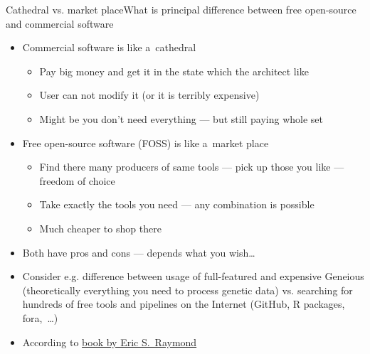 \documentclass[compress, xelatex, 11pt, xcolor=svgnames, aspectratio=169,
	hyperref={
		bookmarks=true,
		unicode=true,
		colorlinks=true,
		pdftitle={Linux, command line and MetaCentrum},
		plainpages=false,
		pdfauthor={Vojtech Zeisek},
		pdfsubject={Course about use of Linux command line, writing shell scripts and using MetaCentrum of CESNET},
		pdfcreator={XeLaTeX},
		pdfkeywords={Linux, GNU, BASH, shell, command line, MetaCentrum},
		linkcolor=DarkRed, %
		anchorcolor=DarkBlue, %
		citecolor=Indigo, %
		filecolor=NavyBlue, %
		menucolor=DarkMagenta, %
		urlcolor=DarkBlue, %
		},
	url={hyphens, lowtilde} %
	]{beamer}
\begin{document}
\begin{frame}{Cathedral vs. market place}{What is principal difference between free open-source and commercial software}
	\begin{itemize}
		\item Commercial software is like a~cathedral
		\begin{itemize}
			\item Pay big money and get it in the state which the architect like
			\item User can not modify it (or it is terribly expensive)
			\item Might be you don't need everything --- but still paying whole set
		\end{itemize}
		\item Free open-source software (FOSS) is like a~market place
		\begin{itemize}
			\item Find there many producers of same tools --- pick up those you like --- freedom of choice
			\item Take exactly the tools you need --- any combination is possible
			\item Much cheaper to shop there
		\end{itemize}
		\item Both have pros and cons --- depends what you wish\ldots
		\item Consider e.g. difference between usage of full-featured and expensive Geneious (theoretically everything you need to process genetic data) vs. searching for hundreds of free tools and pipelines on the Internet (GitHub, R packages, fora,~\ldots)
		\item According to \href{https://en.wikipedia.org/wiki/The_Cathedral_and_the_Bazaar}{book by Eric S.~Raymond}
	\end{itemize}
\end{frame}
\end{document}
